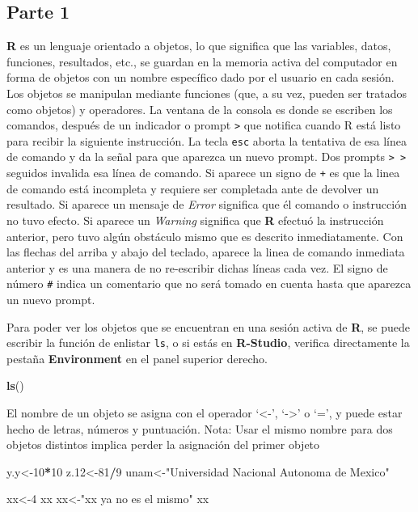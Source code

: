 \documentclass[]{article}
\newenvironment{Shaded}{\begin{snugshade}}{\end{snugshade}}
\newcommand{\DecValTok}[1]{\textcolor[rgb]{0.00,0.00,0.81}{#1}}
\newcommand{\FloatTok}[1]{\textcolor[rgb]{0.00,0.00,0.81}{#1}}
\newcommand{\KeywordTok}[1]{\textcolor[rgb]{0.13,0.29,0.53}{\textbf{#1}}}
\newcommand{\NormalTok}[1]{#1}
\newcommand{\OperatorTok}[1]{\textcolor[rgb]{0.81,0.36,0.00}{\textbf{#1}}}
\newcommand{\StringTok}[1]{\textcolor[rgb]{0.31,0.60,0.02}{#1}}
\begin{document}
\hypertarget{parte-1}{%
\subsection{Parte 1}\label{parte-1}}

\textbf{R} es un lenguaje orientado a objetos, lo que significa que las
variables, datos, funciones, resultados, etc., se guardan en la memoria
activa del computador en forma de objetos con un nombre específico dado
por el usuario en cada sesión. Los objetos se manipulan mediante
funciones (que, a su vez, pueden ser tratados como objetos) y
operadores. La ventana de la consola es donde se escriben los comandos,
después de un indicador o prompt \texttt{\textgreater{}} que notifica
cuando R está listo para recibir la siguiente instrucción. La tecla
\texttt{esc} aborta la tentativa de esa línea de comando y da la señal
para que aparezca un nuevo prompt. Dos prompts
\texttt{\textgreater{}\ \textgreater{}} seguidos invalida esa línea de
comando. Si aparece un signo de \texttt{+} es que la linea de comando
está incompleta y requiere ser completada ante de devolver un resultado.
Si aparece un mensaje de \emph{Error} significa que él comando o
instrucción no tuvo efecto. Si aparece un \emph{Warning} significa que
\textbf{R} efectuó la instrucción anterior, pero tuvo algún obstáculo
mismo que es descrito inmediatamente. Con las flechas del arriba y abajo
del teclado, aparece la linea de comando inmediata anterior y es una
manera de no re-escribir dichas líneas cada vez. El signo de número
\texttt{\#} indica un comentario que no será tomado en cuenta hasta que
aparezca un nuevo prompt.

Para poder ver los objetos que se encuentran en una sesión activa de
\textbf{R}, se puede escribir la función de enlistar \texttt{ls}, o si
estás en \textbf{R-Studio}, verifica directamente la pestaña
\textbf{Environment} en el panel superior derecho.

\begin{Shaded}
\begin{Highlighting}[]
\KeywordTok{ls}\NormalTok{()}
\end{Highlighting}
\end{Shaded}

El nombre de un objeto se asigna con el operador `\textless-',
`-\textgreater{}' o `=', y puede estar hecho de letras, números y
puntuación. Nota: Usar el mismo nombre para dos objetos distintos
implica perder la asignación del primer objeto

\begin{Shaded}
\begin{Highlighting}[]
\NormalTok{y.y<-}\DecValTok{10}\OperatorTok{*}\DecValTok{10}
\NormalTok{z}\FloatTok{.12}\NormalTok{<-}\DecValTok{81}\OperatorTok{/}\DecValTok{9}
\NormalTok{unam<-}\StringTok{"Universidad Nacional Autonoma de Mexico"}

\NormalTok{xx<-}\DecValTok{4}
\NormalTok{xx}
\NormalTok{xx<-}\StringTok{"xx ya no es el mismo"}
\NormalTok{xx}
\end{Highlighting}
\end{Shaded}
\end{document}
